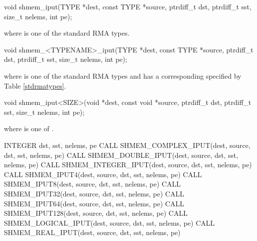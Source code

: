 
\begin{apidefinition}

\begin{C11synopsis}
void shmem_iput(TYPE *dest, const TYPE *source, ptrdiff_t dst, ptrdiff_t sst, size_t nelems, int pe);
\end{C11synopsis}
where \TYPE{} is one of the standard \ac{RMA} types.

\begin{Csynopsis}
void shmem_<TYPENAME>_iput(TYPE *dest, const TYPE *source, ptrdiff_t dst, ptrdiff_t sst, size_t nelems, int pe);
\end{Csynopsis}
where \TYPE{} is one of the standard \ac{RMA} types and has a corresponding \TYPENAME{} specified by Table \ref{stdrmatypes}.

\begin{CsynopsisCol}
void shmem_iput<SIZE>(void *dest, const void *source, ptrdiff_t dst, ptrdiff_t sst, size_t nelems, int pe);
\end{CsynopsisCol}
where \SIZE{} is one of .

\begin{Fsynopsis}
INTEGER dst, sst, nelems, pe
CALL SHMEM_COMPLEX_IPUT(dest, source, dst, sst, nelems, pe)
CALL SHMEM_DOUBLE_IPUT(dest, source, dst, sst, nelems, pe)
CALL SHMEM_INTEGER_IPUT(dest, source, dst, sst, nelems, pe)
CALL SHMEM_IPUT4(dest, source, dst, sst, nelems, pe)
CALL SHMEM_IPUT8(dest, source, dst, sst, nelems, pe)
CALL SHMEM_IPUT32(dest, source, dst, sst, nelems, pe)
CALL SHMEM_IPUT64(dest, source, dst, sst, nelems, pe)
CALL SHMEM_IPUT128(dest, source, dst, sst, nelems, pe)
CALL SHMEM_LOGICAL_IPUT(dest, source, dst, sst, nelems, pe)
CALL SHMEM_REAL_IPUT(dest, source, dst, sst, nelems, pe)
\end{Fsynopsis}


\end{apidefinition}

